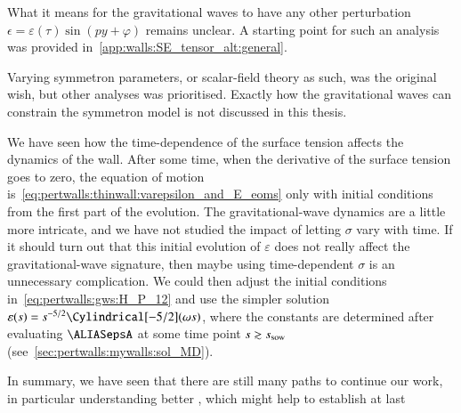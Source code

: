 







What it means for the gravitational waves to have any other perturbation $\epsilon= \varepsilon(\tau) \sin{(py + \varphi)}$ remains unclear. A starting point for such an analysis was provided in~\cref{app:walls:SE_tensor_alt:general}. 

Varying symmetron parameters, or scalar-field theory as such, was the original wish, but other analyses was prioritised. Exactly how the gravitational waves can constrain the symmetron model is not discussed in this thesis.

We have seen how the time-dependence of the surface tension affects the dynamics of the wall. %
After some time, when the derivative of the surface tension goes to zero, the equation of motion is~\cref{eq:pertwalls:thinwall:varepsilon_and_E_eoms} only with initial conditions from the first part of the evolution. The gravitational-wave dynamics are a little more intricate, and we have not studied the impact of letting $\sigma$ vary with time. If it should turn out that this initial evolution of $\varepsilon$ does not really affect the gravitational-wave signature, then maybe using time-dependent $\sigma$ is an unnecessary complication. We could then adjust the initial conditions in~\cref{eq:pertwalls:gws:H_P_12} and use the simpler solution $\varepsilon(s)= {s}^{-5/2} \Cylindrical[-5/2](\omega s)$, where the constants are determined after evaluating $\epsA$ at some time point $s\gtrsim s_\mathrm{sow}$ (see~\cref{sec:pertwalls:mywalls:sol_MD}).


In summary, we have seen that there are still many paths to continue our work, in particular understanding better \comment{\dots}, which might help to establish at last \comment{\dots}















